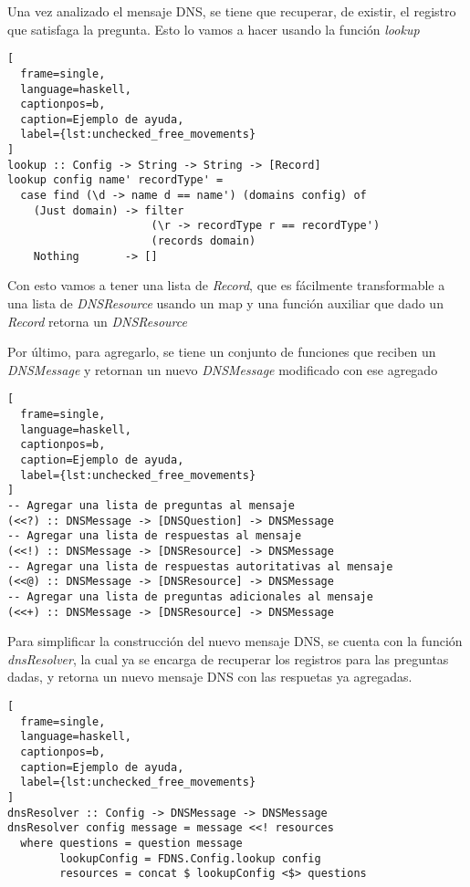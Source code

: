 \documentclass[6pt]{article}
\begin{document}
Una vez analizado el mensaje DNS, se tiene que recuperar, de existir,
el registro que satisfaga la pregunta. Esto lo vamos a hacer usando
la función \textit{lookup}

\begin{lstlisting}[
  frame=single,
  language=haskell,
  captionpos=b,
  caption=Ejemplo de ayuda,
  label={lst:unchecked_free_movements}
]
lookup :: Config -> String -> String -> [Record]
lookup config name' recordType' =
  case find (\d -> name d == name') (domains config) of
    (Just domain) -> filter
                      (\r -> recordType r == recordType')
                      (records domain)
    Nothing       -> []
\end{lstlisting}

Con esto vamos a tener una lista de \textit{Record}, que
es fácilmente transformable a una lista de \textit{DNSResource}
usando un map y una función auxiliar que dado un \textit{Record}
retorna un \textit{DNSResource}

Por último, para agregarlo, se tiene un conjunto de funciones
que reciben un \textit{DNSMessage} y retornan un nuevo
\textit{DNSMessage} modificado con ese agregado

\begin{lstlisting}[
  frame=single,
  language=haskell,
  captionpos=b,
  caption=Ejemplo de ayuda,
  label={lst:unchecked_free_movements}
]
-- Agregar una lista de preguntas al mensaje
(<<?) :: DNSMessage -> [DNSQuestion] -> DNSMessage
-- Agregar una lista de respuestas al mensaje
(<<!) :: DNSMessage -> [DNSResource] -> DNSMessage
-- Agregar una lista de respuestas autoritativas al mensaje
(<<@) :: DNSMessage -> [DNSResource] -> DNSMessage
-- Agregar una lista de preguntas adicionales al mensaje
(<<+) :: DNSMessage -> [DNSResource] -> DNSMessage
\end{lstlisting}

Para simplificar la construcción del nuevo mensaje DNS, se cuenta con
la función \textit{dnsResolver}, la cual ya se encarga de recuperar
los registros para las preguntas dadas, y retorna un nuevo mensaje
DNS con las respuetas ya agregadas.

\clearpage
\begin{lstlisting}[
  frame=single,
  language=haskell,
  captionpos=b,
  caption=Ejemplo de ayuda,
  label={lst:unchecked_free_movements}
]
dnsResolver :: Config -> DNSMessage -> DNSMessage
dnsResolver config message = message <<! resources
  where questions = question message
        lookupConfig = FDNS.Config.lookup config
        resources = concat $ lookupConfig <$> questions
\end{lstlisting}
\end{document}
